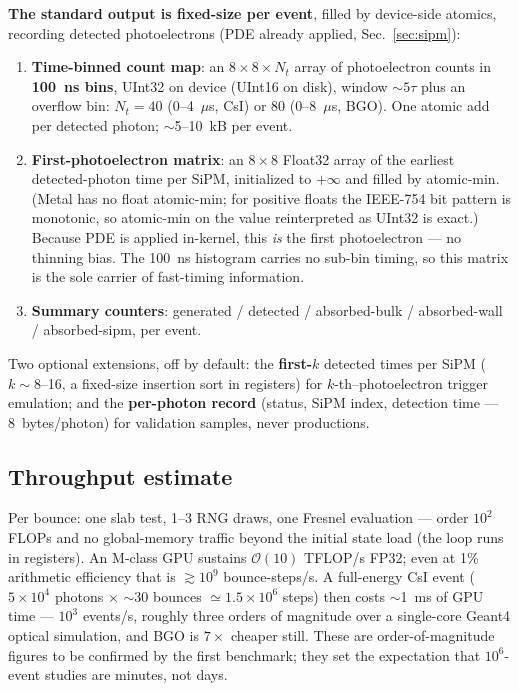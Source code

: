 \documentclass[11pt,a4paper]{article}
\newcommand{\csi}{CsI}
\newcommand{\bgo}{BGO}
\begin{document}
\textbf{The standard output is fixed-size per event}, filled by device-side atomics,
recording detected photoelectrons (PDE already applied, Sec.~\ref{sec:sipm}):
\begin{enumerate}
  \item \textbf{Time-binned count map}: an $8\times8\times N_t$ array of photoelectron
    counts in \textbf{100~ns bins}, UInt32 on device (UInt16 on disk), window
    $\sim 5\tau$ plus an overflow bin: $N_t = 40$ (0--4~$\mu$s, \csi{}) or 80
    (0--8~$\mu$s, \bgo{}). One atomic add per detected photon;
    $\sim$5--10~kB per event.
  \item \textbf{First-photoelectron matrix}: an $8\times8$ Float32 array of the earliest
    detected-photon time per SiPM, initialized to $+\infty$ and filled by atomic-min.
    (Metal has no float atomic-min; for positive floats the IEEE-754 bit pattern is
    monotonic, so atomic-min on the value reinterpreted as UInt32 is exact.) Because PDE is
    applied in-kernel, this \emph{is} the first photoelectron --- no thinning bias. The
    100~ns histogram carries no sub-bin timing, so this matrix is the sole carrier of
    fast-timing information.
  \item \textbf{Summary counters}: generated / detected / absorbed-bulk / absorbed-wall /
    absorbed-sipm, per event.
\end{enumerate}
Two optional extensions, off by default: the \textbf{first-$k$} detected times per SiPM
($k \sim 8$--16, a fixed-size insertion sort in registers) for $k$-th--photoelectron trigger
emulation; and the \textbf{per-photon record} (status, SiPM index, detection time ---
8~bytes/photon) for validation samples, never productions.

\subsection{Throughput estimate}

Per bounce: one slab test, 1--3 RNG draws, one Fresnel evaluation --- order
$10^2$ FLOPs and no global-memory traffic beyond the initial state load (the loop runs in
registers). An M-class GPU sustains $\mathcal{O}(10)$ TFLOP/s FP32; even at 1\% arithmetic
efficiency that is $\gtrsim 10^9$ bounce-steps/s. A full-energy \csi{} event
($5\times10^4$ photons $\times$ $\sim$30 bounces $\simeq 1.5\times10^6$ steps) then costs
$\sim$1~ms of GPU time --- $10^3$ events/s, roughly three orders of magnitude over a
single-core Geant4 optical simulation, and \bgo{} is $7\times$ cheaper still. These are
order-of-magnitude figures to be confirmed by the first benchmark; they set the expectation
that $10^6$-event studies are minutes, not days.
\end{document}
